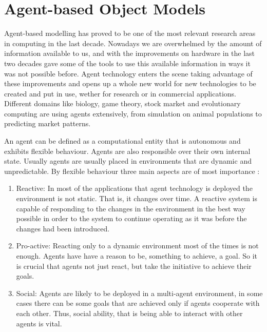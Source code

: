 \section{Agent-based Object Models}

Agent-based modelling has proved to be one of the most relevant research areas in computing in the last decade. Nowadays we are overwhelmed by the amount of information available to us, and with the improvements on hardware in the last two decades gave some of the tools to use this available information in ways it was not possible before. Agent technology enters the scene taking advantage of these improvements and opens up a whole new world for new technologies to be created and put in use, wether for research or in  commercial applications. Different domains like biology, game theory, stock market and evolutionary computing are using agents extensively, from simulation on animal populations \cite{Caplat2008491} to predicting market patterns. \cite{andreoni1995}

An agent can be defined as a computational entity that is autonomous and exhibits flexible behaviour. Agents are also responsible over their own internal state. Usually agents are usually placed in environments that are dynamic and unpredictable. By flexible behaviour three main aspects are of most importance \cite{wooldridge2009introduction} :

\begin{enumerate}
\item Reactive: In most of the applications that agent technology is deployed the environment is not static. That is, it changes over time. A reactive system is capable of responding to the changes in the environment in the best way possible in order to the system to continue operating as it was before the changes had been introduced. 

\item Pro-active: Reacting only to a dynamic environment most of the times is not enough. Agents have have a reason to be, something to achieve, a goal. So it is crucial that agents not just react, but take the initiative to achieve their goals.

\item Social: Agents are likely to be deployed in a multi-agent environment, in some cases there can be some goals that are achieved only if agents cooperate with each other. Thus, social ability, that is being able to interact with other agents is vital.
\end{enumerate}

